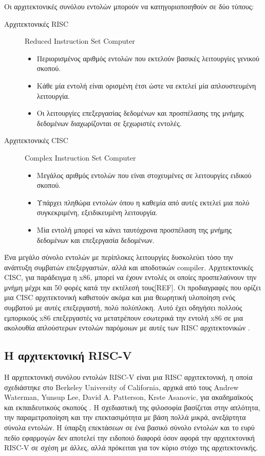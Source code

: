 \documentclass[11pt]{extarticle}
\begin{document}
Οι αρχιτεκτονικές συνόλου εντολών μπορούν να κατηγοριοποιηθούν σε δύο τύπους:
\begin{description}
\item[Αρχιτεκτονικές RISC] Reduced Instruction Set Computer
\begin{itemize}
    \item Περιορισμένος αριθμός εντολών που εκτελούν βασικές λειτουργίες γενικού σκοπού.
    \item Κάθε μία εντολή είναι ορισμένη έτσι ώστε να εκτελεί μία απλουστευμένη λειτουργία.
    \item Οι λειτουργίες επεξεργασίας δεδομένων και προσπέλασης της μνήμης δεδομένων διαχωρίζονται σε ξεχωριστές εντολές.
\end{itemize}

\item[Αρχιτεκτονικές CISC] Complex Instruction Set Computer
\begin{itemize}
    \item Μεγάλος αριθμός εντολών που είναι στοχευμένες σε λειτουργίες ειδικού σκοπού.
    \item Υπάρχει πληθώρα εντολών όπου η καθεμία από αυτές εκτελεί μια πολύ συγκεκριμένη, εξειδικευμένη λειτουργία.
    \item Μία εντολή μπορεί να κάνει ταυτόχρονα προσπέλαση της μνήμης δεδομένων και επεξεργασία δεδομένων.
\end{itemize}
\end{description}

\newpage
Ένα μεγάλο σύνολο εντολών με περίπλοκες λειτουργίες δυσκολεύει τόσο την ανάπτυξη συμβατών επεξεργαστών, αλλά και αποδοτικών compiler.
Αρχιτεκτονικές CISC, για παράδειγμα η x86, μπορεί να έχουν εντολές οι οποίες προσπελαύνουν την μνήμη μέχρι και 50 φορές κατά την εκτέλεσή τους[REF].
Οι προδιαγραφές που ορίζει μια CISC αρχιτεκτονική καθιστούν ακόμα και μια θεωρητική υλοποίηση ενός συμβατού με αυτές επεξεργαστή, πολύ πολύπλοκη.
Αυτό έχει οδηγήσει πολλούς εμπορικούς x86 επεξεργαστές να μετατρέπουν εσωτερικά την εντολή x86 σε μια ακολουθία απλούστερων εντολών παρόμοιων με αυτές των RISC αρχιτεκτονικών \cite{patterson}.
\subsection{Η αρχιτεκτονική RISC-V}
Η αρχιτεκτονική συνόλου εντολών RISC-V είναι μια RISC αρχιτεκτονική, η οποία σχεδιάστηκε στο Berkeley University of California, αρχικά από τους Andrew Waterman, Yunsup Lee, David A. Patterson, Krste Asanovic, για ακαδημαϊκούς και εκπαιδευτικούς σκοπούς \cite{spec}. 
Η σχεδιαστική της φιλοσοφία βασίζεται στην απλότητα, την παραμετροποίηση και την επεκτασιμότητα με βάση πολλά μικρά, ανεξάρτητα σύνολα εντολών.
Η ύπαρξη επεκτάσεων σε ένα βασικό σύνολο εντολών και το ευρύ πεδίο εφαρμογών δεν αποτελεί την ειδοποιό διαφορά όσον αφορά την αρχιτεκτονική RISC-V σε σχέση με άλλες, αλλά πρόκειται για τον κύριο στόχο της αρχιτεκτονικής.
\end{document}
